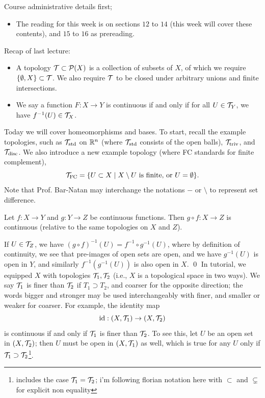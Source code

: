 \noindent Course administrative details first;
\begin{itemize}
    \item The reading for this week is on sections $12$ to $14$ (this week will cover these contents), and $15$ to $16$ as prereading.
\end{itemize}
Recap of last lecture:
\begin{itemize}
    \item A topology $\mathcal T \subset \mathcal P(X)$ is a collection of subsets of $X$, of which we require $\{\emptyset, X\} \subset \mathcal T$. We also require $\mathcal T$ to be closed under arbitrary unions and finite intersections.
    \item We say a function $F : X \to Y$ is continuous if and only if for all $U \in \mathcal T_Y$, we have $f^{-1}(U) \in \mathcal T_X$.
\end{itemize}
Today we will cover homeomorphisms and bases. To start, recall the example topologies, such as $\mathcal T_{\mathrm{std}}$ on $\mathbb R^n$ (where $\mathcal T_{\mathrm{std}}$ consists of the open balls), $\mathcal T_\mathrm{triv}$, and $\mathcal T_\mathrm{disc}$. We also introduce a new example topology (where FC standards for finite complement),
\[ \mathcal T_\mathrm{FC} = \{ U \subset X \mid X \setminus U \text{ is finite, or } U = \emptyset \}. \]
Note that Prof. Bar-Natan may interchange the notations $-$ or $\setminus$ to represent set difference.
\begin{simplethm}
    Let $f : X \to Y$ and $g : Y \to Z$ be continuous functions. Then $g \circ f : X \to Z$ is continuous (relative to the same topologies on $X$ and $Z$).
\end{simplethm}
\noindent If $U \in \mathcal T_Z$, we have $(g \circ f)^{-1}(U) = f^{-1} \circ g^{-1} (U)$, where by definition of continuity, we see that pre-images of open sets are open, and we have $g^{-1}(U)$ is open in $Y$, and similarly $f^{-1} (g^{-1}(U))$ is also open in $X$. \qed
\medskip\newline
\noindent In tutorial, we equipped $X$ with topologies $\mathcal T_1, \mathcal T_2$ (i.e., $X$ is a topological space in two ways). We say $\mathcal T_1$ is finer than $\mathcal T_2$ if $T_1 \supset T_2$, and coarser for the opposite direction; the words bigger and stronger may be used interchangeably with finer, and smaller or weaker for coarser. For example, the identity map
\[ \mathrm{id} : (X, \mathcal T_1) \to (X, \mathcal T_2) \]
is continuous if and only if $\mathcal T_1$ is finer than $\mathcal T_2$. To see this, let $U$ be an open set in $(X, \mathcal T_2)$; then $U$ must be open in $(X, \mathcal T_1)$ as well, which is true for any $U$ only if $\mathcal T_1 \supset \mathcal T_2$\footnote{includes the case $\mathcal T_1 = \mathcal T_2$; i'm following florian notation here with $\subset$ and $\subsetneq$ for explicit non equality}.
